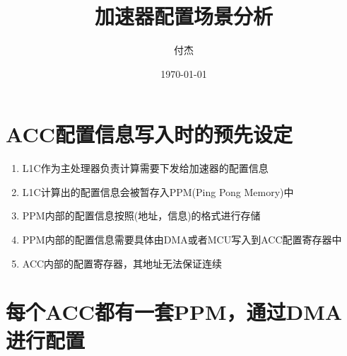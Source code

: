 \documentclass[a4paper, 12pt]{article}
\title{加速器配置场景分析}
\author{付杰}
\date{\today}
\newif\ifchinese %
\begin{document}
\maketitle
\thispagestyle{empty} %
\newpage


\tableofcontents %
\newpage





\setcounter{page}{1}

\newpage 
\section{ACC配置信息写入时的预先设定}%

\begin{enumerate}
  \item L1C作为主处理器负责计算需要下发给加速器的配置信息
  \item L1C计算出的配置信息会被暂存入PPM(Ping Pong Memory)中
  \item PPM内部的配置信息按照(地址，信息)的格式进行存储
  \item PPM内部的配置信息需要具体由DMA或者MCU写入到ACC配置寄存器中
  \item ACC内部的配置寄存器，其地址无法保证连续
\end{enumerate}
  
\newpage
\section{每个ACC都有一套PPM，通过DMA进行配置}%
\end{document}
